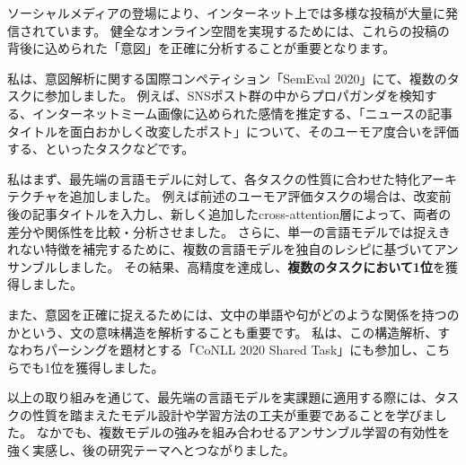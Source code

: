 ソーシャルメディアの登場により、インターネット上では多様な投稿が大量に発信されています。
健全なオンライン空間を実現するためには、これらの投稿の背後に込められた「意図」を正確に分析することが重要となります。

私は、意図解析に関する国際コンペティション「SemEval 2020」にて、複数のタスクに参加しました。
例えば、SNSポスト群の中からプロパガンダを検知する、インターネットミーム画像に込められた感情を推定する、「ニュースの記事タイトルを面白おかしく改変したポスト」について、そのユーモア度合いを評価する、といったタスクなどです。

私はまず、最先端の言語モデルに対して、各タスクの性質に合わせた特化アーキテクチャを追加しました。
例えば前述のユーモア評価タスクの場合は、改変前後の記事タイトルを入力し、新しく追加したcross-attention層によって、両者の差分や関係性を比較・分析させました。
さらに、単一の言語モデルでは捉えきれない特徴を補完するために、複数の言語モデルを独自のレシピに基づいてアンサンブルしました。
その結果、高精度を達成し、\textbf{複数のタスクにおいて1位}を獲得しました。

また、意図を正確に捉えるためには、文中の単語や句がどのような関係を持つのかという、文の意味構造を解析することも重要です。
私は、この構造解析、すなわちパーシングを題材とする「CoNLL 2020 Shared Task」にも参加し、こちらでも1位を獲得しました。

以上の取り組みを通じて、最先端の言語モデルを実課題に適用する際には、タスクの性質を踏まえたモデル設計や学習方法の工夫が重要であることを学びました。
なかでも、複数モデルの強みを組み合わせるアンサンブル学習の有効性を強く実感し、後の研究テーマへとつながりました。
